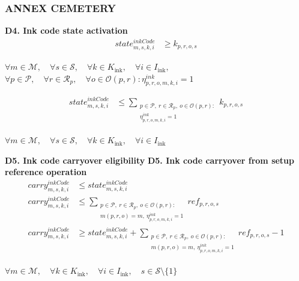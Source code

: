 \documentclass{article}
\begin{document}
\subsubsection*{ANNEX CEMETERY}

\noindent\textbf{D4. Ink code state activation}
\begin{align}
state^{inkCode}_{m,s,k,i}
&\ge
k_{p,r,o,s}
\label{eq:D4_ink_code_state_lb}
\end{align}
\begin{center}
$\forall m \in \mathcal{M}, \quad
\forall s \in \mathcal{S}, \quad
\forall k \in K_{\text{ink}}, \quad
\forall i \in I_{\text{ink}},$
\\
$\forall p \in \mathcal{P}, \quad
\forall r \in \mathcal{R}_p, \quad
\forall o \in \mathcal{O}(p,r):
\eta^{ink}_{p,r,o,m,k,i}=1$
\end{center}

\begin{align}
state^{inkCode}_{m,s,k,i}
&\le
\sum_{\substack{
p \in \mathcal{P},\ r \in \mathcal{R}_p,\ o \in \mathcal{O}(p,r):\\
\eta^{ink}_{p,r,o,m,k,i}=1
}}
k_{p,r,o,s}
\label{eq:D4_ink_code_state_ub}
\end{align}
\begin{center}
$\forall m \in \mathcal{M}, \quad
\forall s \in \mathcal{S}, \quad
\forall k \in K_{\text{ink}}, \quad
\forall i \in I_{\text{ink}}$
\end{center}

\noindent\textbf{D5. Ink code carryover eligibility}
\noindent\textbf{D5. Ink code carryover from setup reference operation}
\begin{align}
carry^{inkCode}_{m,s,k,i}
&\le
state^{inkCode}_{m,s,k,i}
\label{eq:D5_ink_code_carry_current_state}
\\
carry^{inkCode}_{m,s,k,i}
&\le
\sum_{\substack{
p \in \mathcal{P},\ r \in \mathcal{R}_p,\ o \in \mathcal{O}(p,r):\\
m(p,r,o)=m,\ \eta^{ink}_{p,r,o,m,k,i}=1
}}
ref_{p,r,o,s}
\label{eq:D5_ink_code_carry_reference_ub}
\\
carry^{inkCode}_{m,s,k,i}
&\ge
state^{inkCode}_{m,s,k,i}
+
\sum_{\substack{
p \in \mathcal{P},\ r \in \mathcal{R}_p,\ o \in \mathcal{O}(p,r):\\
m(p,r,o)=m,\ \eta^{ink}_{p,r,o,m,k,i}=1
}}
ref_{p,r,o,s}
- 1
\label{eq:D5_ink_code_carry_reference_lb}
\end{align}
\begin{center}
$\forall m \in \mathcal{M}, \quad
\forall k \in K_{\text{ink}}, \quad
\forall i \in I_{\text{ink}}, \quad
s \in \mathcal{S}\setminus\{1\}$
\end{center}
\end{document}
